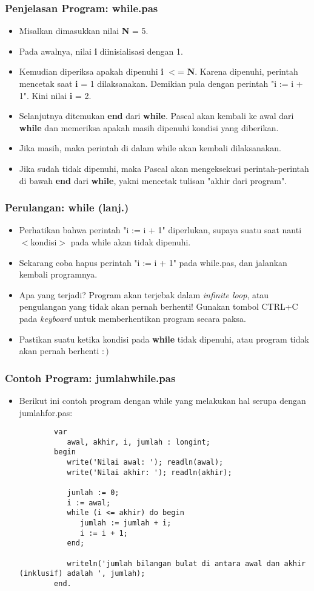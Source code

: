 \documentclass{beamer}
\begin{document}
\begin{frame}
\frametitle{Penjelasan Program: while.pas}
\begin{itemize}
	\item Misalkan dimasukkan nilai \textbf{N} = 5.
	\item Pada awalnya, nilai \textbf{i} diinisialisasi dengan 1.
	\item Kemudian diperiksa apakah dipenuhi \textbf{i} $<$= \textbf{N}. Karena dipenuhi, perintah mencetak saat \textbf{i} = 1 dilaksanakan. Demikian pula dengan perintah "i := i + 1". Kini nilai \textbf{i} = 2.
	\item Selanjutnya ditemukan \textbf{end} dari \textbf{while}. Pascal akan kembali ke awal dari \textbf{while} dan memeriksa apakah masih dipenuhi kondisi yang diberikan.
	\item Jika masih, maka perintah di dalam while akan kembali dilaksanakan.
	\item Jika sudah tidak dipenuhi, maka Pascal akan mengeksekusi perintah-perintah di bawah \textbf{end} dari \textbf{while}, yakni mencetak tulisan "akhir dari program".
\end{itemize}
\end{frame}

\begin{frame}
\frametitle{Perulangan: while (lanj.)}
\begin{itemize}
	\item Perhatikan bahwa perintah "i := i + 1" diperlukan, supaya suatu saat nanti $<$kondisi$>$ pada while akan tidak dipenuhi.
	\item Sekarang coba hapus perintah "i := i + 1" pada while.pas, dan jalankan kembali programnya.
	\item Apa yang terjadi? Program akan terjebak dalam \alert{\textit{infinite loop}}, atau \alert{pengulangan yang tidak akan pernah berhenti}! Gunakan tombol CTRL+C pada \textit{keyboard} untuk memberhentikan program secara paksa.
	\item Pastikan suatu ketika kondisi pada \textbf{while} tidak dipenuhi, atau program tidak akan pernah berhenti $:)$
\end{itemize}
\end{frame}

\begin{frame}[fragile]
\frametitle{Contoh Program: jumlahwhile.pas}
\begin{itemize}
	\item Berikut ini contoh program dengan while yang melakukan hal serupa dengan jumlahfor.pas:
	\begin{lstlisting}
		var
		   awal, akhir, i, jumlah : longint;
		begin
		   write('Nilai awal: '); readln(awal);
		   write('Nilai akhir: '); readln(akhir);
		
		   jumlah := 0;
		   i := awal;
		   while (i <= akhir) do begin
		      jumlah := jumlah + i;
		      i := i + 1;
		   end;
		
		   writeln('jumlah bilangan bulat di antara awal dan akhir (inklusif) adalah ', jumlah);
		end.
	\end{lstlisting}
\end{itemize}
\end{frame}
\end{document}
